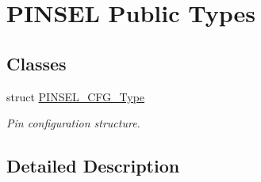 \hypertarget{group___p_i_n_s_e_l___public___types}{}\section{P\+I\+N\+S\+EL Public Types}
\label{group___p_i_n_s_e_l___public___types}
\subsection*{Classes}
\begin{DoxyCompactItemize}
\item 
struct \hyperlink{struct_p_i_n_s_e_l___c_f_g___type}{P\+I\+N\+S\+E\+L\+\_\+\+C\+F\+G\+\_\+\+Type}
\begin{DoxyCompactList}\small\item\em Pin configuration structure. \end{DoxyCompactList}\end{DoxyCompactItemize}


\subsection{Detailed Description}

